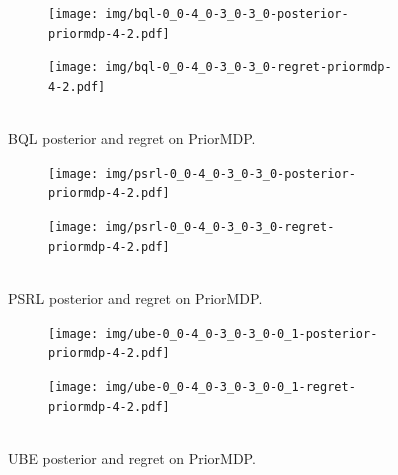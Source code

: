 \documentclass{article}
\begin{document}
\begin{appendices}
\begin{figure}[h!]
\centering
\begin{subfigure}{0.65\textwidth}
\texttt{[image: img/bql-0\_0-4\_0-3\_0-3\_0-posterior-priormdp-4-2.pdf]}
\end{subfigure}
\begin{subfigure}{0.34\textwidth}
\texttt{[image: img/bql-0\_0-4\_0-3\_0-3\_0-regret-priormdp-4-2.pdf]}~\\~\\
\end{subfigure}
\captionsetup{width=0.9\linewidth}
\caption{BQL posterior and regret on PriorMDP.}\label{bql_priormdp_visual}
\end{figure}

\begin{figure}[h!]
\centering
\begin{subfigure}{0.65\textwidth}
\texttt{[image: img/psrl-0\_0-4\_0-3\_0-3\_0-posterior-priormdp-4-2.pdf]}
\end{subfigure}
\begin{subfigure}{0.34\textwidth}
\texttt{[image: img/psrl-0\_0-4\_0-3\_0-3\_0-regret-priormdp-4-2.pdf]}~\\~\\
\end{subfigure}
\captionsetup{width=0.9\linewidth}
\caption{PSRL posterior and regret on PriorMDP.}\label{psrl_priormdp_visual}
\end{figure}

\begin{figure}[h!]
\centering
\begin{subfigure}{0.65\textwidth}
\texttt{[image: img/ube-0\_0-4\_0-3\_0-3\_0-0\_1-posterior-priormdp-4-2.pdf]}
\end{subfigure}
\begin{subfigure}{0.34\textwidth}
\texttt{[image: img/ube-0\_0-4\_0-3\_0-3\_0-0\_1-regret-priormdp-4-2.pdf]}~\\~\\
\end{subfigure}
\captionsetup{width=0.9\linewidth}
\caption{UBE posterior and regret on PriorMDP.}\label{ube_priormdp_visual01}
\end{figure}


\end{appendices}
\end{document}
